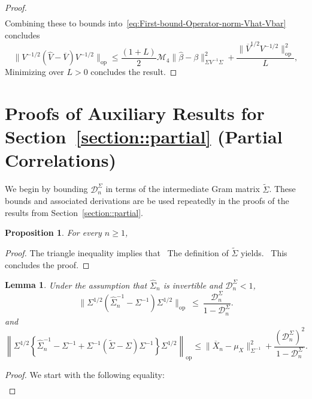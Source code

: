 \documentclass{article}
\newtheorem{lemma}{Lemma}
\newtheorem{proposition}{Proposition}
\begin{document}
\begin{appendices}
\begin{proof}
\begin{align*}
\end{align*}
Combining these to bounds into~\eqref{eq:First-bound-Operator-norm-Vhat-Vbar} concludes
\begin{equation}\label{eq:First-bound-Operator-norm-Vhat-Vbar}
\|V^{-1/2}(\widehat{V} - \overline{V})V^{-1/2}\|_{\mathrm{op}} \le \frac{(1 + L)}{2}\mathcal{M}_4\|\widehat{\beta} - \beta\|_{\Sigma V^{-1}\Sigma}^2 + \frac{\|\overline{V}^{1/2}V^{-1/2}\|_{\mathrm{op}}^2}{L},
\end{equation}
Minimizing over $L > 0$ concludes the result.
\end{proof}
\section{Proofs of Auxiliary Results for Section~\ref{section::partial} (Partial Correlations)}
\label{appendix:auxiliary.partial}
We begin by bounding $\mathcal{D}_n^{\Sigma}$ in terms of the intermediate Gram matrix $\widetilde{\Sigma}$. These bounds and associated derivations are be used repeatedly in the proofs of the results from Section~\ref{section::partial}.
\begin{proposition}\label{prop:bounding-D-sigma}
For every $n\ge1$,
\ \end{proposition}
\begin{proof}
The triangle inequality implies that
\ The definition of $\widetilde{\Sigma}$ yields.
\ This concludes the proof.
\end{proof}
\begin{lemma}\label{lemma:linear-expansion-inv-covariance}
Under the assumption that $\widehat{\Sigma}_n$ is invertible and $\mathcal{D}_n^{\Sigma} <1$,
\begin{equation}\label{eq:inv-covariance-error-bound}
\|\Sigma^{1/2}(\widehat{\Sigma}_n^{-1} - \Sigma^{-1})\Sigma^{1/2}\|_{\mathrm{op}} ~\le~ \frac{\mathcal{D}_n^{\Sigma}}{1 - \mathcal{D}_n^{\Sigma}}.
\end{equation}
and
\begin{equation}\label{eq:final-linear-expansion-inv-covariance}
\left\|\Sigma^{1/2}\left\{\widehat{\Sigma}_n^{-1} - \Sigma^{-1} + \Sigma^{-1}(\widetilde{\Sigma} - \Sigma)\Sigma^{-1}\right\}\Sigma^{1/2}\right\|_{\mathrm{op}} \le \|\overline{X}_n - \mu_X\|^2_{\Sigma^{-1}} + \frac{(\mathcal{D}_n^{\Sigma})^2}{1 - \mathcal{D}_n^{\Sigma}}.
\end{equation}
\end{lemma}
\begin{proof}
We start with the following equality:
\begin{align*}

\end{align*}
\end{proof}
\end{appendices}
\end{document}
